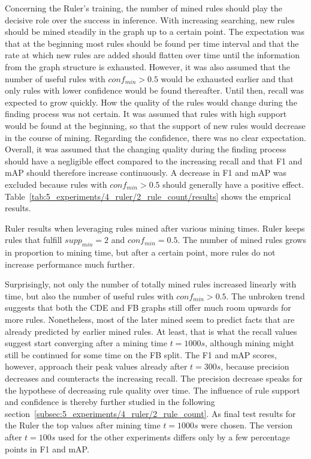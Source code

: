 Concerning the Ruler's training, the number of mined rules should play the decisive role over the success in inference. With increasing searching, new rules should be mined steadily in the graph up to a certain point. The expectation was that at the beginning most rules should be found per time interval and that the rate at which new rules are added should flatten over time until the information from the graph structure is exhausted. However, it was also assumed that the number of useful rules with $conf_{min} > 0.5$ would be exhausted earlier and that only rules with lower confidence would be found thereafter. Until then, recall was expected to grow quickly. How the quality of the rules would change during the finding process was not certain. It was assumed that rules with high support would be found at the beginning, so that the support of new rules would decrease in the course of mining. Regarding the confidence, there was no clear expectation. Overall, it was assumed that the changing quality during the finding process should have a negligible effect compared to the increasing recall and that F1 and mAP should therefore increase continuously. A decrease in F1 and mAP was excluded because rules with $conf_{min} > 0.5$ should generally have a positive effect. Table~\ref{tab:5_experiments/4_ruler/2_rule_count/results} shows the emprical results.

\begin{table}
    \makebox[\textwidth][c]{
        
    }
    \caption{Ruler results when leveraging rules mined after various mining times. Ruler keeps rules that fulfill $supp_{min} = 2$ and $conf_{min} = 0.5$. The number of mined rules grows in proportion to mining time, but after a certain point, more rules do not increase performance much further.}
    \label{tab:5_experiments/4_ruler/2_rule_count/results}
\end{table}

Surprisingly, not only the number of totally mined rules increased linearly with time, but also the number of useful rules with $conf_{min} > 0.5$. The unbroken trend suggests that both the CDE and FB graphs still offer much room upwards for more rules. Nonetheless, most of the later mined seem to predict facts that are already predicted by earlier mined rules. At least, that is what the recall values suggest start converging after a mining time $t = 1000s$, although mining might still be continued for some time on the FB split. The F1 and mAP scores, however, approach their peak values already after $t = 300s$, because precision decreases and counteracts the increasing recall. The precision decrease speaks for the hypothese of decreasing rule quality over time. The influence of rule support and confidence is thereby further studied in the following section~\ref{subsec:5_experiments/4_ruler/2_rule_count}. As final test results for the Ruler the top values after mining time $t = 1000s$ were chosen. The version after $t = 100s$ used for the other experiments differs only by a few percentage points in F1 and mAP.
